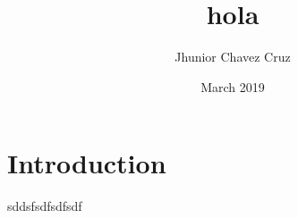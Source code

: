\documentclass{article}
\title{hola}
\author{Jhunior Chavez Cruz}
\date{March 2019}
\begin{document}
\maketitle

\section{Introduction}
sddsfsdfsdfsdf
\end{document}

